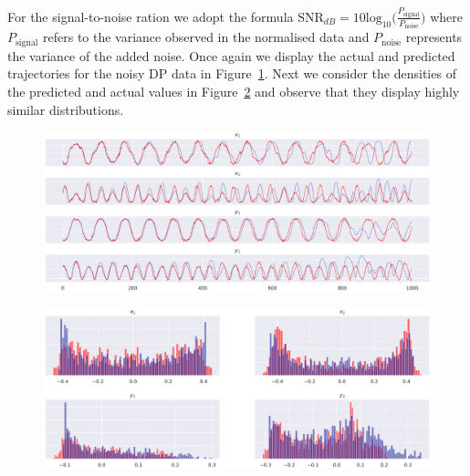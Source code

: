 For the signal-to-noise ration we adopt the formula $\text{SNR}_{dB}=10\text{log}_{10}\big(\frac{P_\text{{signal}}}{P_{\text{noise}}}\big)$ where $P_\text{{signal}}$ refers to the variance observed in the normalised data and $P_{\text{noise}}$ represents the variance of the added noise.
Once again we display the actual and predicted trajectories for the noisy DP data in Figure~\ref{fig:noisydp_success_traj}. 
Next we consider the densities of the predicted and actual values in Figure~\ref{fig:noisydp_success_density} and observe that they display highly similar distributions.

\begin{figure}[ht]
  \centering
  \includegraphics[width=0.95\linewidth]{Graphs/_dp_noise_FigCD_2030.eps} 
 \label{fig:noisydp_success_traj}
\end{figure}
\begin{figure}[ht]
  \centering
  \includegraphics[width=\linewidth]{Graphs/_dp_noise_2B_2030.eps}
  \label{fig:noisydp_success_density}
 \end{figure}

